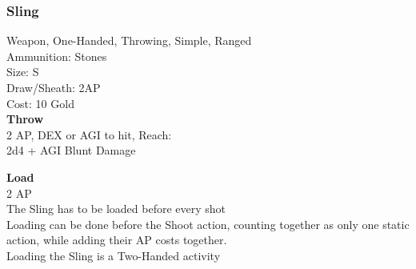 \subsubsection{Sling}\label{weapon:sling}
Weapon, One-Handed, Throwing, Simple, Ranged\\
Ammunition: Stones\\
Size: S\\
Draw/Sheath: 2AP\\
Cost: 10 Gold\\

\textbf{Throw}\\
2 AP, DEX or AGI to hit,  Reach:\\
2d4 + \texttimes AGI Blunt Damage

\textbf{Load}\\
2 AP\\
The Sling has to be loaded before every shot\\
Loading can be done before the Shoot action, counting together as only one static action, while adding their AP costs together.\\
Loading the Sling is a Two-Handed activity
